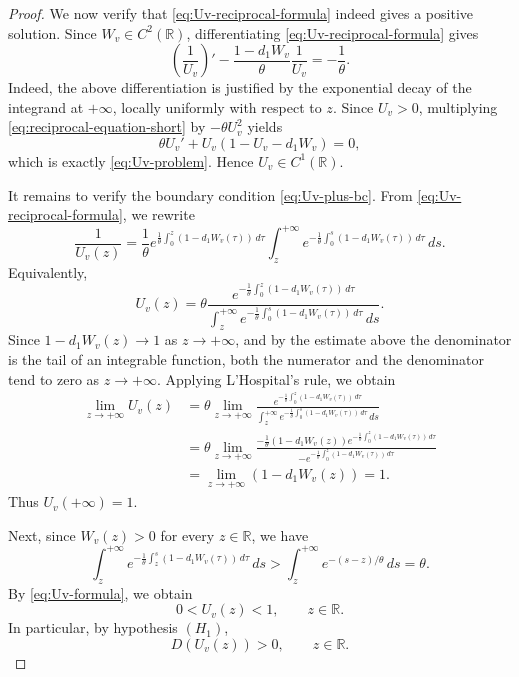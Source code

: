 \documentclass[preprint,sort&compress,final,12pt]{elsarticle}
\numberwithin{equation}{section}
\begin{document}
\begin{proof}
We now verify that \eqref{eq:Uv-reciprocal-formula} indeed gives a positive solution. Since $W_v\in C^2(\mathbb R)$, differentiating \eqref{eq:Uv-reciprocal-formula} gives
\begin{equation}\label{eq:reciprocal-equation-short}
\left(\frac{1}{U_v}\right)'-\frac{1-d_1W_v}{\theta}\frac{1}{U_v}=-\frac{1}{\theta}.
\end{equation}
Indeed, the above differentiation is justified by the exponential decay of the integrand at $+\infty$, locally uniformly with respect to $z$. Since $U_v>0$, multiplying \eqref{eq:reciprocal-equation-short} by $-\theta U_v^2$ yields
\begin{equation*}
\theta U_v'+U_v(1-U_v-d_1W_v)=0,
\end{equation*}
which is exactly \eqref{eq:Uv-problem}. Hence $U_v\in C^1(\mathbb R)$.

It remains to verify the boundary condition \eqref{eq:Uv-plus-bc}. From \eqref{eq:Uv-reciprocal-formula}, we rewrite
\begin{equation*}
\frac{1}{U_v(z)}=\frac{1}{\theta}e^{\frac{1}{\theta}\int_0^z(1-d_1W_v(\tau))\,d\tau}\int_z^{+\infty}e^{-\frac{1}{\theta}\int_0^s(1-d_1W_v(\tau))\,d\tau}\,ds.
\end{equation*}
Equivalently,
\begin{equation*}
U_v(z)=\theta\frac{e^{-\frac{1}{\theta}\int_0^z(1-d_1W_v(\tau))\,d\tau}}{\int_z^{+\infty}e^{-\frac{1}{\theta}\int_0^s(1-d_1W_v(\tau))\,d\tau}\,ds}.
\end{equation*}
Since $1-d_1W_v(z)\to1$ as $z\to+\infty$, and by the estimate above the denominator is the tail of an integrable function, both the numerator and the denominator tend to zero as $z\to+\infty$. Applying L'Hospital's rule, we obtain
\begin{align*}
\lim_{z\to+\infty}U_v(z)
&=\theta\lim_{z\to+\infty}\frac{e^{-\frac{1}{\theta}\int_0^z(1-d_1W_v(\tau))\,d\tau}}{\int_z^{+\infty}e^{-\frac{1}{\theta}\int_0^s(1-d_1W_v(\tau))\,d\tau}\,ds
}\\
&=\theta\lim_{z\to+\infty}\frac{-\frac{1}{\theta}(1-d_1W_v(z))e^{-\frac{1}{\theta}\int_0^z(1-d_1W_v(\tau))\,d\tau}}{-e^{-\frac{1}{\theta}\int_0^z(1-d_1W_v(\tau))\,d\tau}
}\\
&=\lim_{z\to+\infty}(1-d_1W_v(z))=1.
\end{align*}
Thus $U_v(+\infty)=1$.

Next, since $W_v(z)>0$ for every $z\in\mathbb R$,  we have
\begin{equation*}
\int_z^{+\infty}e^{-\frac{1}{\theta}\int_z^s(1-d_1W_v(\tau))\,d\tau}\,ds>
\int_z^{+\infty}e^{-(s-z)/\theta}\,ds=\theta.
\end{equation*}
By \eqref{eq:Uv-formula}, we obtain
\begin{equation*}
0<U_v(z)<1,\qquad z\in\mathbb R.
\end{equation*}
In particular, by hypothesis $(H_1)$,
\begin{equation*}
D(U_v(z))>0,\qquad z\in\mathbb R.
\end{equation*}


\end{proof}
\end{document}
